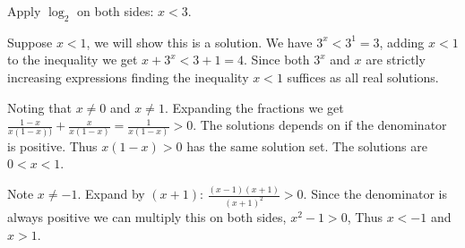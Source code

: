 \begin{problem}
{	\item Apply $\log_2$ on both sides: $x < 3$.
	
	\item Suppose $x < 1$, we will show this is a solution. We have $3^x<3^1 = 3$, adding $x<1$ to the inequality we get $x+3^x<3+1=4$. Since both $3^x$ and $x$ are strictly increasing expressions finding the inequality $x<1$ suffices as all real solutions.
	
	\item Noting that $x\neq 0$ and $x\neq 1$. Expanding the fractions we get $\frac{1-x}{x(1-x))}+\frac{x}{x(1-x)}=\frac{1}{x(1-x)}>0$. The solutions depends on if the denominator is positive. Thus $x(1-x)>0$ has the same solution set. The solutions are $0 < x < 1$.
	
	\item Note $x\neq -1$. Expand by $(x+1)$: $\frac{(x-1)(x+1)}{(x+1)^2}>0$. Since the denominator is always positive we can multiply this on both sides, $x^2-1>0$, Thus $x < -1$ and $x > 1$.
	}
\end{problem}

